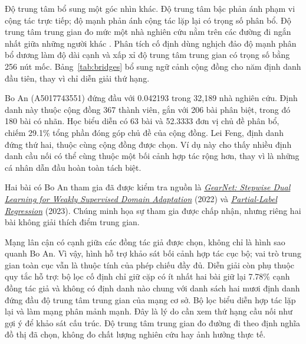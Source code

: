 Độ trung tâm bổ sung một góc nhìn khác. Độ trung tâm bậc phản ánh phạm vi cộng
tác trực tiếp; độ mạnh phản ánh cộng tác lặp lại có trọng số phân bổ. Độ trung
tâm trung gian đo mức một nhà nghiên cứu nằm trên các đường đi ngắn nhất giữa
những người khác \citep{freeman1977betweenness}. Phân tích cố định dùng nghịch
đảo độ mạnh phân bổ dương làm độ dài cạnh và xấp xỉ độ trung tâm trung gian có
trọng số bằng 256 nút mốc. Bảng~\ref{tab:bridges} bổ sung ngữ cảnh cộng đồng
cho năm định danh đầu tiên, thay vì chỉ diễn giải thứ hạng.



Bo An (A5017743551) đứng đầu với 0.042193 trong 32,189 nhà nghiên cứu.
Định danh này thuộc cộng đồng 367 thành viên, gắn với 206 bài phân biệt, trong
đó 180 bài có nhãn. Học biểu diễn có 63 bài và 52.3333 đơn vị chủ đề phân bổ,
chiếm 29.1\% tổng phần đóng góp chủ đề của cộng đồng. Lei Feng, định danh đứng
thứ hai, thuộc cùng cộng đồng được chọn. Ví dụ này cho thấy nhiều định danh
cầu nối có thể cùng thuộc một bối cảnh hợp tác rộng hơn, thay vì là những cá
nhân dẫn đầu hoàn toàn tách biệt.

Hai bài có Bo An tham gia đã được kiểm tra nguồn là
\href{https://doi.org/10.1609/aaai.v36i8.20851}{\emph{GearNet: Stepwise Dual
Learning for Weakly Supervised Domain Adaptation}} (2022) và
\href{https://doi.org/10.1609/aaai.v37i6.25871}{\emph{Partial-Label Regression}}
(2023). Chúng minh họa sự tham gia được chấp nhận, nhưng riêng hai bài không
giải thích điểm trung gian.

\FloatBarrier

Mạng lân cận có cạnh giữa các đồng tác giả được chọn, không chỉ là hình sao
quanh Bo An. Vì vậy, hình hỗ trợ khảo sát bối cảnh hợp tác cục bộ; vai trò
trung gian toàn cục vẫn là thuộc tính của phép chiếu đầy đủ. Diễn giải còn phụ
thuộc quy tắc hỗ trợ: bộ lọc cố định chỉ giữ cặp có ít nhất hai bài giữ lại
7.78\% cạnh đồng tác giả và không có định danh nào chung với danh sách hai mươi
định danh đứng đầu độ trung tâm trung gian của mạng cơ sở. Bộ lọc biểu diễn
hợp tác lặp lại và làm mạng phân mảnh mạnh. Đây là lý do cần xem thứ hạng cầu
nối như gợi ý để khảo sát cấu trúc. Độ trung tâm trung gian đo đường đi theo
định nghĩa đồ thị đã chọn, không đo chất lượng nghiên cứu hay ảnh hưởng thực tế.

